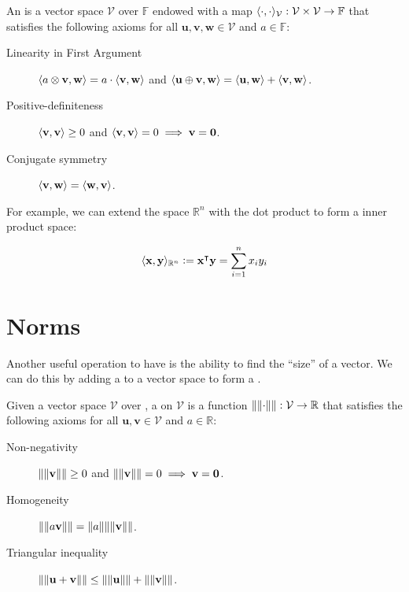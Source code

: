 \begin{definition}
An  is a vector space $\mathcal{V}$ over $\mathbb{F}$ endowed with a map $\langle\cdot, \cdot\rangle_\mathcal{V} : \mathcal{V} \times \mathcal{V} \to \mathbb{F}$ that satisfies the following axioms for all $\mathbf{u}, \mathbf{v}, \mathbf{w} \in \mathcal{V}$ and $a \in \mathbb{F}$:
\begin{description}
  \item[Linearity in First Argument] $\langle a \otimes \mathbf{v}, \mathbf{w}\rangle = a \cdot \langle\mathbf{v}, \mathbf{w}\rangle$ and $\langle\mathbf{u} \oplus \mathbf{v}, \mathbf{w}\rangle = \langle\mathbf{u}, \mathbf{w}\rangle + \langle\mathbf{v}, \mathbf{w}\rangle$.
  \item[Positive-definiteness] $\langle\mathbf{v}, \mathbf{v}\rangle \geq 0$ and $\langle\mathbf{v}, \mathbf{v}\rangle = 0 \implies \mathbf{v} = \mathbf{0}$.
  \item[Conjugate symmetry] $\langle\mathbf{v}, \mathbf{w}\rangle = \langle\mathbf{w}, \mathbf{v}\rangle$.
\end{description}
\end{definition}

For example, we can extend the space $\mathbb{R}^n$ with the dot product to form a inner product space:

\begin{equation}
  \langle\mathbf{x}, \mathbf{y}\rangle_{\mathbb{R}^n} \vcentcolon= \mathbf{x}^\intercal \mathbf{y} = \sum_{i=1}^n x_i y_i
\end{equation}


\section{Norms}
Another useful operation to have is the ability to find the ``size'' of a vector. We can do this by adding a  to a vector space to form a .

\begin{definition}[Norm]
Given a vector space $\mathcal{V}$ over , a  on $\mathcal{V}$ is a function $\lVert\lVert\cdot\rVert\rVert : \mathcal{V} \to \mathbb{R}$ that satisfies the following axioms for all $\mathbf{u}, \mathbf{v} \in \mathcal{V}$ and $a \in \mathbb{R}$:
\begin{description}
  \item[Non-negativity] $\lVert\lVert\mathbf{v}\rVert\rVert \geq 0$ and $\lVert\lVert\mathbf{v}\rVert\rVert = 0 \implies \mathbf{v} = \mathbf{0}$.
  \item[Homogeneity] $\lVert\lVert a \mathbf{v}\rVert\rVert = \lVert a\rVert \lVert\lVert\mathbf{v}\rVert\rVert$.
  \item[Triangular inequality] $\lVert\lVert\mathbf{u} + \mathbf{v}\rVert\rVert \leq \lVert\lVert\mathbf{u}\rVert\rVert + \lVert\lVert\mathbf{v}\rVert\rVert$.
\end{description}
\end{definition}

